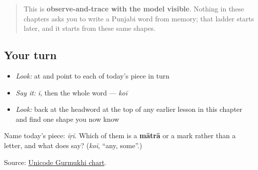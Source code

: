 \begin{quote}
This is \textbf{observe-and-trace with the model visible}. Nothing in these chapters asks you to write a Punjabi word from memory; that ladder starts later, and it starts from these same shapes.
\end{quote}

\subsection*{Your turn}
\begin{itemize}
\raggedright
  \item \emph{Look:} at \textbf{} and point to each of today's piece in turn
  \item \emph{Say it:} \emph{ī}, then the whole word — \emph{koī}
  \item \emph{Look:} back at the headword at the top of any earlier lesson in this chapter and find one shape you now know
\end{itemize}

\begin{tcolorbox}[breakable,colback=teal!4,colframe=teal!35!black,title={Before you move on}]
Name today's piece: \emph{īṛī}. Which of them is a \textbf{mātrā} or a mark rather than a letter, and what does \textbf{} say? (\emph{koī}, “any, some”.)

Source: \href{https://www.unicode.org/charts/PDF/U0A00.pdf}{Unicode Gurmukhi chart}.
\end{tcolorbox}
